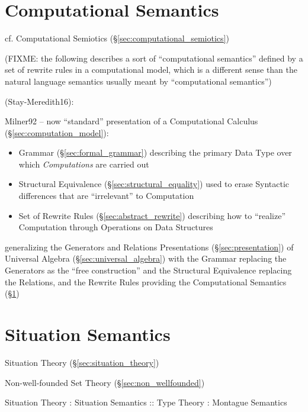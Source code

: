 \section{Computational Semantics}\label{sec:computational_semantics}

cf. Computational Semiotics (\S\ref{sec:computational_semiotics})

(FIXME: the following describes a sort of ``computational semantics'' defined by
a set of rewrite rules in a computational model, which is a different sense than
the natural language semantics usually meant by ``computational semantics'')

(Stay-Meredith16):

Milner92 \cite{milner92} -- now ``standard'' presentation of a Computational
Calculus (\S\ref{sec:computation_model}):
\begin{itemize}
  \item Grammar (\S\ref{sec:formal_grammar}) describing the primary Data Type
    over which \emph{Computations} are carried out
  \item Structural Equivalence (\S\ref{sec:structural_equality}) used to erase
    Syntactic differences that are ``irrelevant'' to Computation
  \item Set of Rewrite Rules (\S\ref{sec:abstract_rewrite}) describing how to
    ``realize'' Computation through Operations on Data Structures
\end{itemize}
generalizing the Generators and Relations Presentations
(\S\ref{sec:presentation}) of Universal Algebra (\S\ref{sec:universal_algebra})
with the Grammar replacing the Generators as the ``free construction'' and the
Structural Equivalence replacing the Relations, and the Rewrite Rules providing
the Computational Semantics (\S\ref{sec:computational_semantics})



\section{Situation Semantics}\label{sec:situation_semantics}

Situation Theory (\S\ref{sec:situation_theory})

Non-well-founded Set Theory (\S\ref{sec:non_wellfounded})

Situation Theory : Situation Semantics
  :: Type Theory : Montague Semantics



